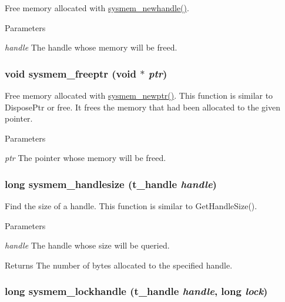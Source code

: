 Free memory allocated with \hyperlink{group__memory_gacdacfad4785c71dc8c4ce5d4d9714d54}{sysmem\_\-newhandle()}. 
\begin{DoxyParams}{Parameters}
\item[{\em handle}]The handle whose memory will be freed. \end{DoxyParams}
\hypertarget{group__memory_ga200c82639e547869db1f3887d17102d3}{
\subsubsection[{sysmem\_\-freeptr}]{\setlength{\rightskip}{0pt plus 5cm}void sysmem\_\-freeptr (void $\ast$ {\em ptr})}}
\label{group__memory_ga200c82639e547869db1f3887d17102d3}


Free memory allocated with \hyperlink{group__memory_ga276676be214edff9fe5c9d0681f39ae6}{sysmem\_\-newptr()}. This function is similar to DisposePtr or free. It frees the memory that had been allocated to the given pointer.


\begin{DoxyParams}{Parameters}
\item[{\em ptr}]The pointer whose memory will be freed. \end{DoxyParams}
\hypertarget{group__memory_ga84cf5e5a070edef2834faf3b7beed5fe}{
\subsubsection[{sysmem\_\-handlesize}]{\setlength{\rightskip}{0pt plus 5cm}long sysmem\_\-handlesize ({\bf t\_\-handle} {\em handle})}}
\label{group__memory_ga84cf5e5a070edef2834faf3b7beed5fe}


Find the size of a handle. This function is similar to GetHandleSize().


\begin{DoxyParams}{Parameters}
\item[{\em handle}]The handle whose size will be queried. \end{DoxyParams}
\begin{DoxyReturn}{Returns}
The number of bytes allocated to the specified handle. 
\end{DoxyReturn}
\hypertarget{group__memory_ga545ea0e5d3d8f14bda62f8ac6b3e6d71}{
\subsubsection[{sysmem\_\-lockhandle}]{\setlength{\rightskip}{0pt plus 5cm}long sysmem\_\-lockhandle ({\bf t\_\-handle} {\em handle}, \/  long {\em lock})}}
\label{group__memory_ga545ea0e5d3d8f14bda62f8ac6b3e6d71}


